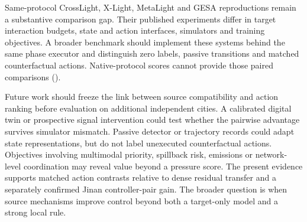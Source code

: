 Same-protocol CrossLight, X-Light, MetaLight and GESA reproductions remain a
substantive comparison gap.  Their published experiments differ in target
interaction budgets, state and action interfaces, simulators and training
objectives.  A broader benchmark should implement these systems behind the
same phase executor and distinguish zero labels, passive transitions and
matched counterfactual actions.  Native-protocol scores cannot provide those
paired comparisons ().

Future work should freeze the link between source compatibility and action
ranking before evaluation on additional independent cities.
A calibrated digital twin or prospective signal intervention could test
whether the pairwise advantage survives simulator mismatch.
Passive detector or trajectory records could adapt state representations,
but do not label unexecuted counterfactual actions.
Objectives involving multimodal priority, spillback risk, emissions or
network-level coordination may reveal value beyond a pressure score.
The present evidence supports matched action contrasts relative to dense
residual transfer and a separately confirmed Jinan controller-pair gain.
The broader question is when source mechanisms improve control beyond both
a target-only model and a strong local rule.
